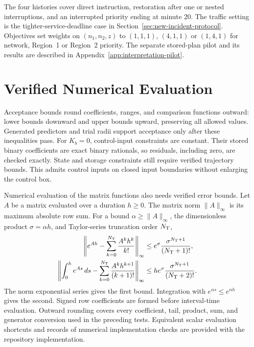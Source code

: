 \documentclass[final]{cas-sc}
\theoremstyle{definition}
\theoremstyle{plain}
\theoremstyle{definition}
\theoremstyle{plain}
\newcommand{\appref}[1]{Appendix~\ref{#1}}
\begin{document}
The four histories cover direct instruction, restoration after one or
nested interruptions, and an interrupted priority ending at minute 20.
The traffic setting is the tighter-service-deadline case in
Section~\ref{sec:new-incident-protocol}. Objectives set weights on
$(n_1,n_2,z)$ to $(1,1,1)$, $(4,1,1)$ or $(1,4,1)$ for network,
Region~1 or Region~2 priority. The separate stored-plan pilot and its
results are described in \appref{app:interpretation-pilot}.



\section{Verified Numerical Evaluation}
\label{app:verified-arithmetic}

Acceptance bounds round coefficients, ranges, and comparison functions
outward: lower bounds downward and upper bounds upward, preserving all
allowed values. Generated predictors and trial radii support acceptance
only after these inequalities pass. For $K_b=0$, control-input constraints
are constant. Their stored binary coefficients are exact binary rationals,
so residuals, including zero, are checked exactly. State and storage
constraints still require verified trajectory bounds. This admits control inputs
on closed input boundaries without enlarging the control box.

Numerical evaluation of the matrix functions also needs verified error
bounds. Let $A$ be a matrix evaluated over a duration $h\ge0$.
The matrix norm $\|A\|_\infty$ is its maximum absolute row sum.
For a bound $\alpha\ge\|A\|_\infty$, the dimensionless product
$\sigma=\alpha h$, and Taylor-series truncation order $N_{\rm T}$,
\begin{equation}
 \begin{aligned}
 \left\|e^{Ah}-\sum_{k=0}^{N_{\rm T}}\frac{A^kh^k}{k!}\right\|_\infty
       &\le e^\sigma\frac{\sigma^{N_{\rm T}+1}}{(N_{\rm T}+1)!},\\
 \left\|\int_0^h e^{As}\,ds-
          \sum_{k=0}^{N_{\rm T}}\frac{A^kh^{k+1}}{(k+1)!}\right\|_\infty
       &\le he^\sigma\frac{\sigma^{N_{\rm T}+1}}{(N_{\rm T}+2)!}.
 \end{aligned}
 \label{eq:structure-matrix-tails}
\end{equation}
The norm exponential series gives the first bound. Integration with
$e^{\alpha s}\le e^{\alpha h}$ gives the second. Signed row coefficients
are formed before interval-time evaluation. Outward rounding covers every
coefficient, tail, product, sum, and generator conversion used in the
preceding tests. Equivalent scalar evaluation shortcuts and records of numerical
implementation checks are provided with the repository implementation.
\end{document}
